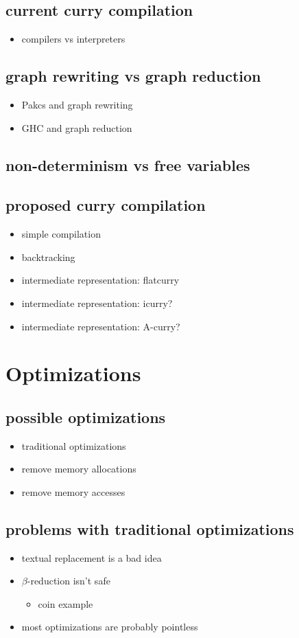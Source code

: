 \documentclass{article}
\begin{document}
\subsection{current curry compilation}
\begin{itemize}
  \item compilers vs interpreters
\end{itemize}
\subsection{graph rewriting vs graph reduction}
\begin{itemize}
  \item Pakcs and graph rewriting
  \item GHC and graph reduction
\end{itemize}
\subsection{non-determinism vs free variables}
\subsection{proposed curry compilation}
\begin{itemize}
  \item simple compilation
  \item backtracking
  \item intermediate representation: flatcurry
  \item intermediate representation: icurry?
  \item intermediate representation: A-curry?
\end{itemize}
\section{Optimizations}
\subsection{possible optimizations}
\begin{itemize}
  \item traditional optimizations
  \item remove memory allocations
  \item remove memory accesses
\end{itemize}
\subsection{problems with traditional optimizations}
\begin{itemize}
  \item textual replacement is a bad idea
  \item $\beta$-reduction isn't safe
  \begin{itemize}
      \item coin example
  \end{itemize}
  \item most optimizations are probably pointless
\end{itemize}
\end{document}
